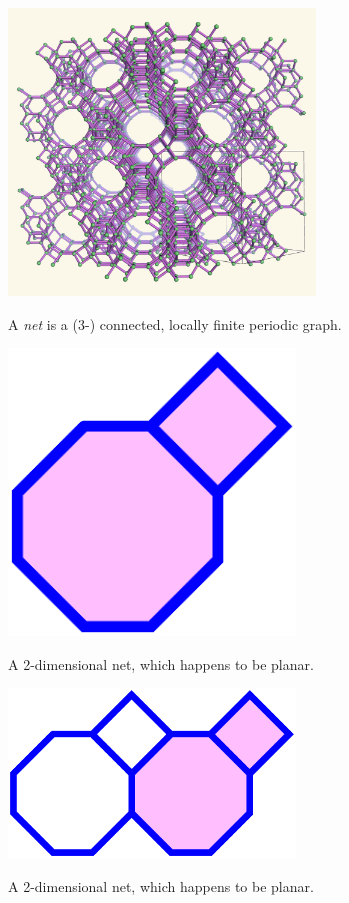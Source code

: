 \documentclass{beamer}
\begin{document}
\begin{frame}
  \begin{center}
    \includegraphics[height=3in]{fau-222}

    A {\em net} is a (3-) connected, locally finite periodic graph.
  \end{center}
\end{frame}

\begin{frame}
  \begin{center}
    \includegraphics[width=3in]{periodic1}

    A 2-dimensional net, which happens to be planar.
  \end{center}
\end{frame}

\begin{frame}
  \begin{center}
    \includegraphics[width=3in]{periodic2}

    A 2-dimensional net, which happens to be planar.
  \end{center}
\end{frame}
\end{document}
